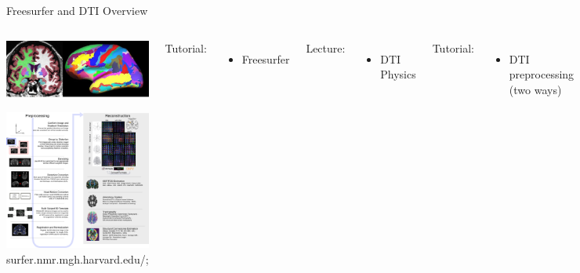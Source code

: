 \documentclass[aspectratio=169,xcolor=dvipsnames]{beamer}
\begin{document}
\begin{frame}{Freesurfer and DTI Overview}
\begin{columns}[c]
\vspace{-.4cm}

\begin{center}
\includegraphics[width=.5\textwidth]{imgs/FSanalysisPipelineFig4}

\includegraphics[width=1\textwidth]{imgs/qsiprep_workflow_full}
\tiny{surfer.nmr.mgh.harvard.edu/; }
\end{center}

Tutorial:
\begin{itemize}
\item Freesurfer
\end{itemize}

Lecture:
\begin{itemize}
\item DTI Physics
\end{itemize}

Tutorial:
\begin{itemize}
\item DTI preprocessing (two ways)
\end{itemize}
\end{columns}

\end{frame}
\end{document}
